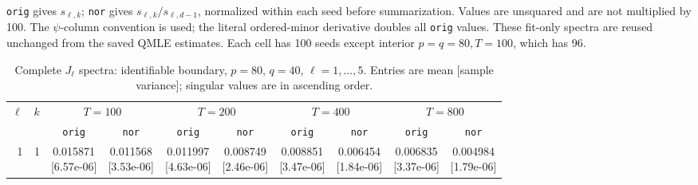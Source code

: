 \documentclass[12pt,letterpaper]{article}
\def\spacingset#1{\renewcommand{\baselinestretch}{#1}\small\normalsize}
\theoremstyle{plain}
\theoremstyle{definition}
\begin{document}
\begin{table}[p]
\begin{adjustbox}{max width=\linewidth}
\begin{tabular}{@{}rr*{8}{c}@{}}
\bottomrule
\end{tabular}
\end{adjustbox}
\par\smallskip
\begin{minipage}{0.98\linewidth}\footnotesize
\texttt{orig} gives $s_{\ell,k}$; \texttt{nor} gives $s_{\ell,k}/s_{\ell,d-1}$, normalized within each seed before summarization. Values are unsquared and are not multiplied by 100. The $\psi$-column convention is used; the literal ordered-minor derivative doubles all \texttt{orig} values. These fit-only spectra are reused unchanged from the saved QMLE estimates. Each cell has 100 seeds except interior $p=q=80,T=100$, which has 96.
\end{minipage}
\endgroup
\end{table}
\clearpage
\begin{table}[p]
\begingroup
\spacingset{1.0}
\small\centering
\caption{Complete $J_\ell$ spectra: identifiable boundary, $p=80$, $q=40$, $\ell=1,\ldots,5$. Entries are mean [sample variance]; singular values are in ascending order.}
\label{s23:lambda:alltab:spectra:p80q40boundary:1-5}
\footnotesize
\setlength{\tabcolsep}{2.2pt}
\renewcommand{\arraystretch}{1.03}
\begin{adjustbox}{max width=\linewidth}
\begin{tabular}{@{}rr*{8}{c}@{}}
\toprule
$\ell$ & $k$ & \multicolumn{2}{c}{$T=100$} & \multicolumn{2}{c}{$T=200$} & \multicolumn{2}{c}{$T=400$} & \multicolumn{2}{c}{$T=800$}\\
\cmidrule(lr){3-4}\cmidrule(lr){5-6}\cmidrule(lr){7-8}\cmidrule(lr){9-10}
 &  & \texttt{orig} & \texttt{nor} & \texttt{orig} & \texttt{nor} & \texttt{orig} & \texttt{nor} & \texttt{orig} & \texttt{nor}\\
\midrule
1 & 1 & \shortstack{0.015871\\[-1pt]{\scriptsize[6.57e-06]}} & \shortstack{0.011568\\[-1pt]{\scriptsize[3.53e-06]}} & \shortstack{0.011997\\[-1pt]{\scriptsize[4.63e-06]}} & \shortstack{0.008749\\[-1pt]{\scriptsize[2.46e-06]}} & \shortstack{0.008851\\[-1pt]{\scriptsize[3.47e-06]}} & \shortstack{0.006454\\[-1pt]{\scriptsize[1.84e-06]}} & \shortstack{0.006835\\[-1pt]{\scriptsize[3.37e-06]}} & \shortstack{0.004984\\[-1pt]{\scriptsize[1.79e-06]}}\\

\end{tabular}
\end{adjustbox}
\end{table}
\end{document}
